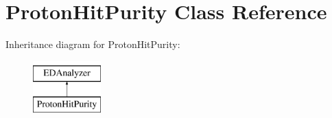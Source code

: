 \hypertarget{classProtonHitPurity}{\section{Proton\-Hit\-Purity Class Reference}
\label{classProtonHitPurity}
}
Inheritance diagram for Proton\-Hit\-Purity\-:\begin{figure}[H]
\begin{center}
\leavevmode
\includegraphics[height=2.000000cm]{classProtonHitPurity}
\end{center}
\end{figure}

